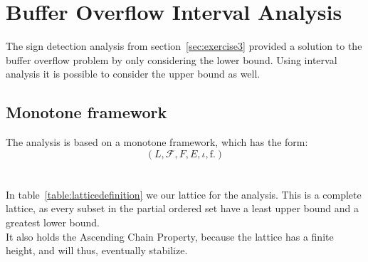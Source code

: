 \chapter{Buffer Overflow Interval Analysis}
The sign detection analysis from section~\ref{sec:exercise3} provided a solution to the buffer overflow problem by only considering the lower bound. Using interval analysis it is possible to consider the upper bound as well.

\section{Monotone framework}
The analysis is based on a monotone framework, which has the form:
\begin{equation}
  \left(L, \mathcal{F}, F, E, \iota, \mathrm{f}.  \right)
  \label{eq:monotone_framework}
\end{equation}
\\\\
In table~\ref{table:latticedefinition} we our lattice for the analysis. This is a complete lattice, as every subset in the partial ordered set have a least upper bound and a greatest lower bound.\\
It also holds the Ascending Chain Property, because the lattice has a finite height, and will thus, eventually stabilize.
